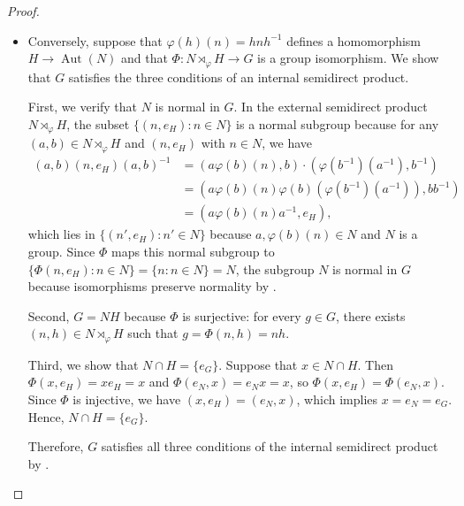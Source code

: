 \begin{proof}
\begin{itemize}
        Under this isomorphism, the subgroup $N \times \{e_H\} = \{(n, e_H) : n \in N\}$ of $N \rtimes_\varphi H$ maps to $\{\Phi(n, e_H) : n \in N\} = \{ne_H : n \in N\} = N$, and the subgroup $\{e_N\} \times H = \{(e_N, h) : h \in H\}$ maps to $H$.

        \item Conversely, suppose that $\varphi(h)(n) = hnh^{-1}$ defines a homomorphism $H \to \operatorname{Aut}(N)$ and that $\Phi: N \rtimes_\varphi H \to G$ is a group isomorphism. We show that $G$ satisfies the three conditions of an internal semidirect product.

        First, we verify that $N$ is normal in $G$. In the external semidirect product $N \rtimes_\varphi H$, the subset $\{(n, e_H) : n \in N\}$ is a normal subgroup because for any $(a, b) \in N \rtimes_\varphi H$ and $(n, e_H)$ with $n \in N$, we have
        \begin{align*}
            (a, b)(n, e_H)(a, b)^{-1} &= (a\varphi(b)(n), b) \cdot (\varphi(b^{-1})(a^{-1}), b^{-1}) \\
            &= (a\varphi(b)(n)\varphi(b)(\varphi(b^{-1})(a^{-1})), bb^{-1}) \\
            &= (a\varphi(b)(n)a^{-1}, e_H),
        \end{align*}
        which lies in $\{(n', e_H) : n' \in N\}$ because $a, \varphi(b)(n) \in N$ and $N$ is a group. Since $\Phi$ maps this normal subgroup to $\{\Phi(n, e_H) : n \in N\} = \{n : n \in N\} = N$, the subgroup $N$ is normal in $G$ because isomorphisms preserve normality by .

        Second, $G = NH$ because $\Phi$ is surjective: for every $g \in G$, there exists $(n, h) \in N \rtimes_\varphi H$ such that $g = \Phi(n, h) = nh$.

        Third, we show that $N \cap H = \{e_G\}$. Suppose that $x \in N \cap H$. Then $\Phi(x, e_H) = xe_H = x$ and $\Phi(e_N, x) = e_Nx = x$, so $\Phi(x, e_H) = \Phi(e_N, x)$. Since $\Phi$ is injective, we have $(x, e_H) = (e_N, x)$, which implies $x = e_N = e_G$. Hence, $N \cap H = \{e_G\}$.

        Therefore, $G$ satisfies all three conditions of the internal semidirect product by .
    \end{itemize}
\end{proof}
